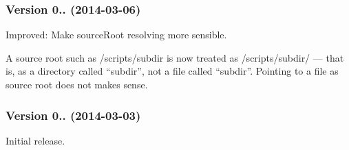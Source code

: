 \subsubsection*{Version 0.. (2014-\/03-\/06)}


\begin{DoxyItemize}
\item Improved\+: Make source\+Root resolving more sensible.

A source root such as {\ttfamily /scripts/subdir} is now treated as {\ttfamily /scripts/subdir/} — that is, as a directory called “subdir”, not a file called “subdir”. Pointing to a file as source root does not makes sense.
\end{DoxyItemize}

\subsubsection*{Version 0.. (2014-\/03-\/03)}


\begin{DoxyItemize}
\item Initial release. 
\end{DoxyItemize}